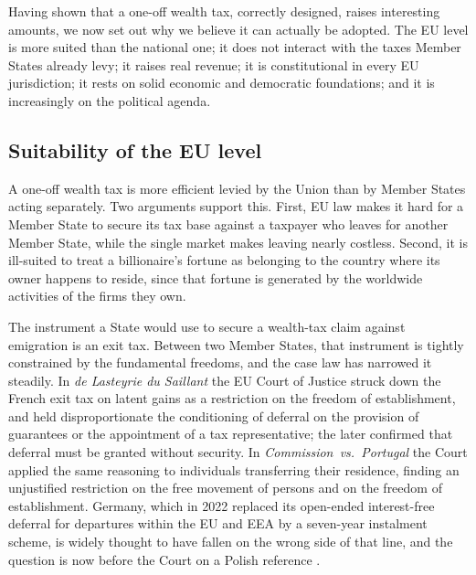\documentclass[../../main]{subfiles}
\begin{document}
Having shown that a one-off wealth tax, correctly designed, raises interesting amounts, we now set out why we believe it can actually be adopted. The EU level is more suited than the national one; it does not interact with the taxes Member States already levy; it raises real revenue; %
it is constitutional in every EU jurisdiction; it rests on solid economic and democratic foundations; and it is increasingly on the political agenda.

\subsection{Suitability of the EU level}\label{sec:level}

A one-off wealth tax is more efficient levied by the Union than by Member States acting separately. Two arguments support this. First, EU law makes it hard for a Member State to secure its tax base against a taxpayer who leaves for another Member State, while the single market makes leaving nearly costless. Second, it is ill-suited to treat a billionaire's fortune as belonging to the country where its owner happens to reside, since that fortune is generated by the worldwide activities of the firms they own.

The instrument a State would use to secure a wealth-tax claim against emigration is an exit tax. Between two Member States, that instrument is tightly constrained by the fundamental freedoms, and the case law has narrowed it steadily. In \emph{de Lasteyrie du Saillant} \citep{CJEULasteyrie2004} the EU Court of Justice struck down the French exit tax on latent gains as a restriction on the freedom of establishment, and held disproportionate the conditioning of deferral on the provision of guarantees or the appointment of a tax representative; the \cite{CJEUN2006} later confirmed that deferral must be granted without security. In \emph{Commission~vs.~Portugal} \citep{CJEUPortugal2016} the Court applied the same reasoning to individuals transferring their residence, finding an unjustified restriction on the free movement of persons and on the freedom of establishment. %
Germany, which in 2022 replaced its open-ended interest-free deferral for departures within the EU and EEA by a seven-year instalment scheme, is widely thought to have fallen on the wrong side of that line, and the question is now before the Court on a Polish reference \citep{CJEUGena2025}. %
\end{document}

